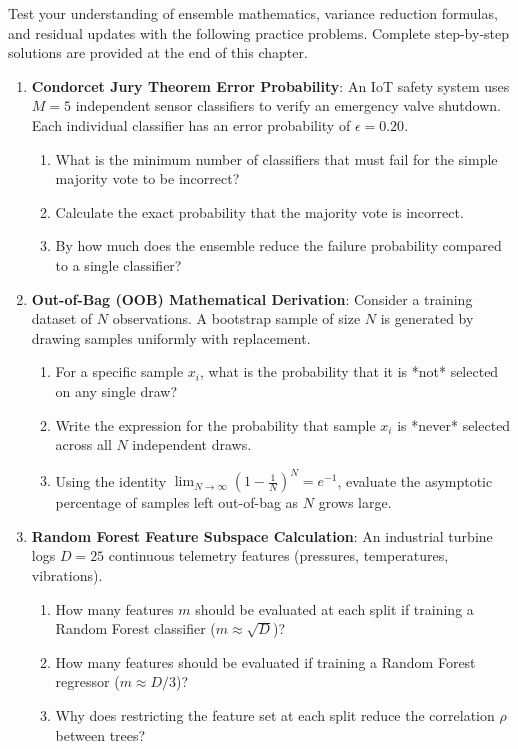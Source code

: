 Test your understanding of ensemble mathematics, variance reduction formulas, and residual updates with the following practice problems. Complete step-by-step solutions are provided at the end of this chapter.

\begin{checkyourself}
\begin{enumerate}
    \item \textbf{Condorcet Jury Theorem Error Probability}:
    An IoT safety system uses $M = 5$ independent sensor classifiers to verify an emergency valve shutdown. Each individual classifier has an error probability of $\epsilon = 0.20$.
    \begin{enumerate}[label=(\alph*)]
        \item What is the minimum number of classifiers that must fail for the simple majority vote to be incorrect?
        \item Calculate the exact probability that the majority vote is incorrect.
        \item By how much does the ensemble reduce the failure probability compared to a single classifier?
    \end{enumerate}

    \item \textbf{Out-of-Bag (OOB) Mathematical Derivation}:
    Consider a training dataset of $N$ observations. A bootstrap sample of size $N$ is generated by drawing samples uniformly with replacement.
    \begin{enumerate}[label=(\alph*)]
        \item For a specific sample $x_i$, what is the probability that it is *not* selected on any single draw?
        \item Write the expression for the probability that sample $x_i$ is *never* selected across all $N$ independent draws.
        \item Using the identity $\lim_{N \to \infty} (1 - \frac{1}{N})^N = e^{-1}$, evaluate the asymptotic percentage of samples left out-of-bag as $N$ grows large.
    \end{enumerate}

    \item \textbf{Random Forest Feature Subspace Calculation}:
    An industrial turbine logs $D = 25$ continuous telemetry features (pressures, temperatures, vibrations).
    \begin{enumerate}[label=(\alph*)]
        \item How many features $m$ should be evaluated at each split if training a Random Forest classifier ($m \approx \sqrt{D}$)?
        \item How many features should be evaluated if training a Random Forest regressor ($m \approx D / 3$)?
        \item Why does restricting the feature set at each split reduce the correlation $\rho$ between trees?
    \end{enumerate}


\end{enumerate}
\end{checkyourself}
